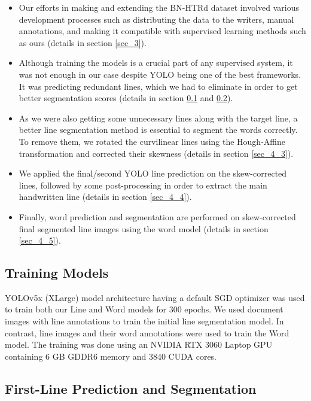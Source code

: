 \documentclass[runningheads]{llncs}
\begin{document}
\begin{itemize}
\setlength\itemsep{2mm}
    \item Our efforts in making and extending the BN-HTRd dataset involved various development processes such as distributing the data to the writers, manual annotations, and making it compatible with supervised learning methods such as ours (details in section \ref{sec_3}).
    
    \item Although training the models is a crucial part of any supervised system, it was not enough in our case despite YOLO being one of the best frameworks. It was predicting redundant lines, which we had to eliminate in order to get better segmentation scores (details in section \ref{sec_4_1} and \ref{sec_4_2}).
    
    \item As we were also getting some unnecessary lines along with the target line, a better line segmentation method is essential to segment the words correctly. To remove them, we rotated the curvilinear lines using the Hough-Affine transformation and corrected their skewness (details in section \ref{sec_4_3}).
    
    \item We applied the final/second YOLO line prediction on the skew-corrected lines, followed by some post-processing in order to extract the main handwritten line (details in section \ref{sec_4_4}).
    
    \item Finally, word prediction and segmentation are performed on skew-corrected final segmented line images using the word model (details in section \ref{sec_4_5}).
\end{itemize}

\subsection{Training Models}
\label{sec_4_1}
YOLOv5x (XLarge) model architecture having a default SGD optimizer was used to train both our Line and Word models for 300 epochs. We used document images with line annotations to train the initial line segmentation model. In contrast, line images and their word annotations were used to train the Word model. The training was done using an NVIDIA RTX 3060 Laptop GPU containing 6 GB GDDR6 memory and 3840 CUDA cores.

\subsection{First-Line Prediction and Segmentation}
\label{sec_4_2}
\end{document}
